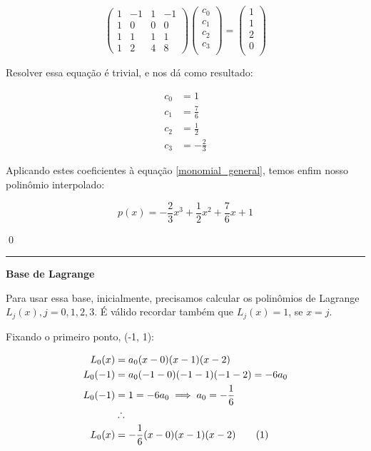 \documentclass[9.5pt,reqno,a4paper]{amsart}
\newcommand\numberthis{\addtocounter{equation}{1}\tag{\theequation}}
\begin{document}
\begin{equation*}
\begin{pmatrix}
1 & -1 & 1 & -1 \\
1 & 0 & 0 & 0 \\
1 & 1 & 1 & 1 \\
1 & 2 & 4 & 8
\end{pmatrix}
\begin{pmatrix}
c_0\\
c_1\\
c_2\\
c_3\\
\end{pmatrix}
=
\begin{pmatrix}
1\\
1\\
2\\
0\\
\end{pmatrix}
\end{equation*}

\bigskip
\bigskip
Resolver essa equação é trivial, e nos dá como resultado:

\begin{align*}
    c_0 &= 1\\
    c_1 & = \frac{7}{6}\\
    c_2 & = \frac{1}{2}\\
    c_3 & = -\frac{2}{3}
\end{align*}

\bigskip
Aplicando estes coeficientes à equação \eqref{monomial_general}, temos enfim nosso polinômio interpolado:

\begin{equation*}
    p(x) = -\frac{2}{3}x^3 + \frac{1}{2}x^2 + \frac{7}{6}x + 1
\end{equation*}

\qed\null

\bigskip
\noindent\rule{\textwidth}{0.4pt}
\textbf{Base de Lagrange}

Para usar essa base, inicialmente, precisamos calcular os polinômios de Lagrange $L_j(x), j= 0, 1, 2, 3$. É válido recordar também que $L_j(x) = 1$, se $x = j$.

\medskip
Fixando o primeiro ponto, (-1, 1):

\begin{align*}
    L_0(x)  &= a_0(x-0)(x-1)(x-2) \\
    L_0(-1) &= a_0(-1-0)(-1-1)(-1-2) = -6a_0 \\
    L_0(-1) &= 1 = -6a_0 \implies a_0 = -\frac{1}{6}\\
    &\therefore\\
    L_0(x) &= -\frac{1}{6}(x-0)(x-1)(x-2) \numberthis \label{l_0}
\end{align*}
\end{document}
